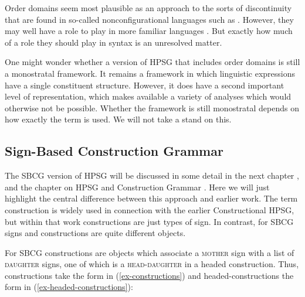 \documentclass[output=paper
	        ,collection
	        ,collectionchapter
 	        ,biblatex
                ,babelshorthands
                ,newtxmath
                ,draftmode
                ,colorlinks, citecolor=brown
]{langscibook}
\begin{document}
Order domains seem most plausible as an approach to the sorts of discontinuity that are found in so-called nonconfigurational languages such as  \citep{DS99a}. However, they may well have a role to play in more familiar languages \citep{BGM99a,Chaves2014a-u}. But exactly how much of a role they should play in syntax is an unresolved matter.

One might wonder whether a version of HPSG that includes order domains is still a monostratal framework. It remains a framework in which linguistic expressions have a single constituent structure. However, it does have a second important level of representation, which makes available a variety of analyses which would otherwise not be possible. Whether the framework is still monostratal depends on how exactly the term is used. We will not take a stand on this.

\subsection{Sign-Based Construction Grammar}\label{sec:prop7.2}
\label{prop:sec-sbcg}

The SBCG version of HPSG will be discussed in some detail in the next chapter , and the chapter on HPSG and Construction Grammar . Here we will just highlight the central difference between this approach and earlier work. The term construction is widely used in connection with the earlier Constructional HPSG, but within that work constructions are just types of sign. In contrast, for SBCG signs and constructions are quite different objects.

For SBCG constructions are objects which associate a \textsc{mother} sign with a list of \textsc{daughter} signs, one of which is a \textsc{head-daughter} in a headed construction. Thus, constructions take the form in (\ref{ex-constructions}) and headed-constructions the form in (\ref{ex-headed-constructions}):

\eal\label{ex:prop48}
\ex\label{ex:prop48a}\label{ex-constructions}
	
	
\ex\label{ex:prop48b}\label{ex-headed-constructions}
\zl
\end{document}
